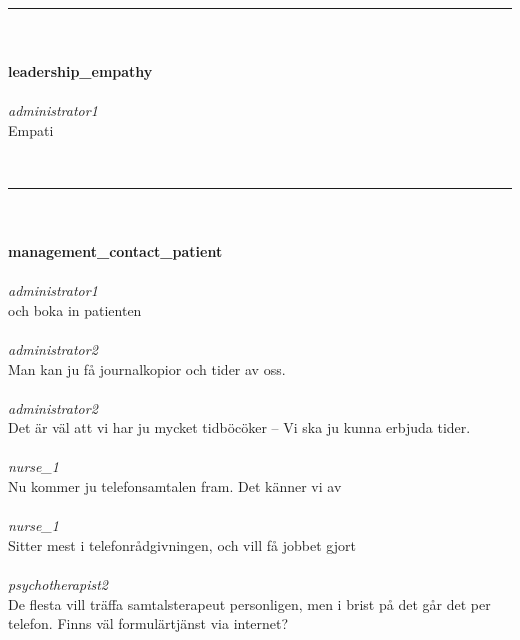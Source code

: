 \documentclass[12pt,a4paper,oneside]{article}
\begin{document}
\ \vspace{.66em}\\
\hrule
\ \vspace{.33em}\\
\ \\{\bf leadership\_empathy }
\\\ \\%
 { \it administrator1 %
}\\
Empati %


\ \vspace{.66em}\\
\hrule
\ \vspace{.33em}\\
\ \\{\bf management\_contact\_patient }
\\\ \\%
 { \it administrator1 %
}\\
och boka in patienten %
\ \\\ \\
 { \it   administrator2 %
}\\
Man kan ju f{\aa} journalkopior och tider av oss. %
\ \\\ \\
 { \it   administrator2 %
}\\
Det {\"a}r v{\"a}l att vi har ju mycket tidb{\"o}c{\"o}ker -- Vi ska ju kunna erbjuda tider.  %
\ \\\ \\
 { \it   nurse\_1 %
}\\
Nu kommer ju telefonsamtalen fram. Det k{\"a}nner vi av %
\ \\\ \\
 { \it   nurse\_1 %
}\\
Sitter mest i telefonr{\aa}dgivningen, och vill f{\aa} jobbet gjort %
\ \\\ \\
 { \it   psychotherapist2 %
}\\
De flesta vill tr{\"a}ffa samtalsterapeut personligen, men i brist p{\aa} det g{\aa}r det per telefon. Finns v{\"a}l formul{\"a}rtj{\"a}nst via internet?  %
\end{document}
